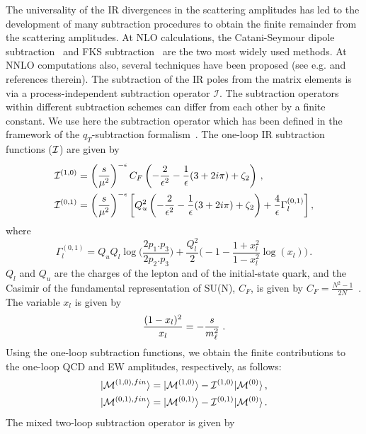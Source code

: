 \documentclass[a4paper]{jpconf}
\begin{document}
The universality of the IR divergences in the scattering amplitudes has led to the development of 
many subtraction procedures to obtain the finite remainder from the scattering amplitudes.
% 
At NLO calculations, the Catani-Seymour dipole subtraction~\cite{Catani:1996jh,Catani:1996vz,Catani:2002hc} 
and FKS subtraction~\cite{Frixione:1995ms} are the two most widely used methods.
At NNLO computations also, several techniques have been proposed (see e.g. \cite{Proceedings:2018jsb} and references therein).
% 
The subtraction of the IR poles from the matrix elements is via a process-independent subtraction operator $\mathcal{I}$.
% 
The subtraction operators within different subtraction schemes can differ from each other by a finite constant.
% 
We use here the subtraction operator which has been defined in the framework of the $q_T$-subtraction formalism~\cite{Catani:2007vq}.
% 
The one-loop IR subtraction functions ($\I$) are given by
%
\begin{align}
\I^{(1,0)} &= \smu^{-\ep} C_F \left( - \frac{2}{\ep^2} - \frac{1}{\ep} (3 + 2 i \pi)  + \zeta_2 \right) \,,
\\
%
\I^{(0,1)} &= \smu^{-\ep} \bigg[ Q_u^2 \left( - \frac{2}{\ep^2} - \frac{1}{\ep} (3 + 2 i \pi)  + \zeta_2 \right)
 + \frac{4}{\ep} {\Gamma}_{l}^{(0,1)} \bigg] \,,
\end{align}
%
where
\begin{equation}
 {\Gamma}_{l}^{(0,1)} = Q_u Q_l \log \bigg( \frac{2 p_1.p_3}{2 p_2.p_3} \bigg)
 + \frac{Q_l^2}{2} \bigg(  -1 - \frac{1+x_l^2}{1-x_l^2} \log (x_l) \bigg) \,.
\end{equation}
%
$Q_l$ and $Q_u$ are the charges of the lepton and of the initial-state quark, and the Casimir of the fundamental representation of SU(N), $C_F$, is given by $C_F=\frac{N^2-1}{2 N}$ \,.
The variable $x_l$ is given by
\begin{equation}
 \frac{(1-x_l)^2}{x_l} = -\frac{s}{m_\ell^2}\;.
\label{eq:defxl}
\end{equation}
% 
Using the one-loop subtraction functions, we obtain the finite contributions to
the one-loop QCD and EW amplitudes, respectively, as follows:
\begin{align}
 | \M^{(1,0),fin} \rangle &= | \M^{(1,0)} \rangle -  \I^{(1,0)} | \M^{(0)} \rangle \,,
 \label{eq:QCDfin}\\
 | \M^{(0,1),fin} \rangle &= | \M^{(0,1)} \rangle -  \I^{(0,1)} | \M^{(0)} \rangle \,.
 \label{eq:EWfin}
\end{align}
%
%
The mixed two-loop subtraction operator is given by
\end{document}
